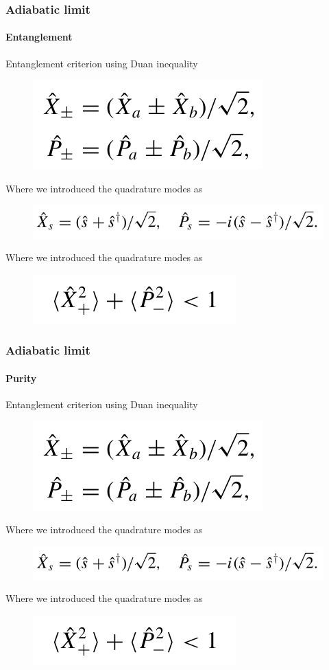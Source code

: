 \documentclass[aspectratio=43]{beamer}
\begin{document}
\begin{frame}
	
	\frametitle{Adiabatic limit}
	\framesubtitle{Entanglement}
	
	Entanglement criterion using Duan inequality 
	\begin{figure}
		\includegraphics[width = 4 cm]{plots/entanglement_quad.png}
	\end{figure}	
	
	Where we introduced the quadrature modes as
	\begin{figure}
		\includegraphics[width = 6.5 cm]{plots/entanglement_quad_2.png}
	\end{figure}

	Where we introduced the quadrature modes as
	\begin{figure}
		\includegraphics[width = 4 cm]{plots/entanglement_duan_criterion.png}
	\end{figure}

\end{frame}

\begin{frame}
	
	\frametitle{Adiabatic limit}
	\framesubtitle{Purity}
	
	Entanglement criterion using Duan inequality 
	\begin{figure}
		\includegraphics[width = 4 cm]{plots/entanglement_quad.png}
	\end{figure}	
	
	Where we introduced the quadrature modes as
	\begin{figure}
		\includegraphics[width = 6.5 cm]{plots/entanglement_quad_2.png}
	\end{figure}
	
	Where we introduced the quadrature modes as
	\begin{figure}
		\includegraphics[width = 4 cm]{plots/entanglement_duan_criterion.png}
	\end{figure}

\end{frame}
\end{document}
